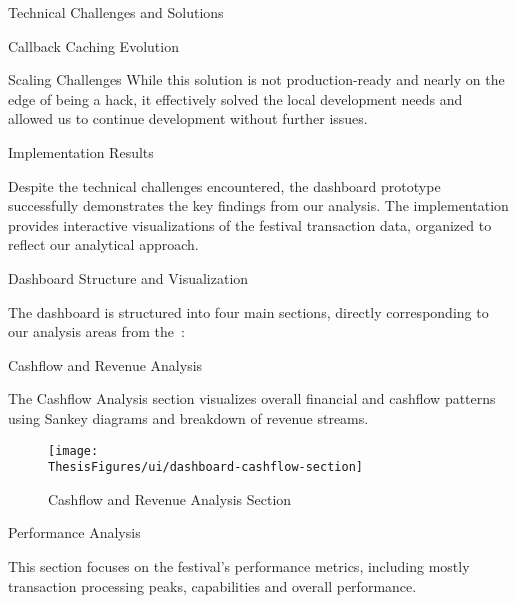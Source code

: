\begin{section}{Technical Challenges and Solutions}
\begin{subsection}{Callback Caching Evolution}
\begin{subsubsection}{Scaling Challenges}
			While this solution is not production-ready and nearly on the edge of being a hack, it effectively solved the local development needs and allowed us to continue development without further issues.
		\end{subsubsection}
	\end{subsection}
\end{section}

\begin{section}{Implementation Results}
	\label{sec:implementation-results}

	Despite the technical challenges encountered, the dashboard prototype successfully demonstrates the key findings from our analysis.
	The implementation provides interactive visualizations of the festival transaction data, organized to reflect our analytical approach.

	\begin{subsection}{Dashboard Structure and Visualization}
		\label{subsec:implementation-results-structure}

		The dashboard is structured into four main sections, directly corresponding to our analysis areas from the~:

		\begin{subsubsection}{Cashflow and Revenue Analysis}
			\label{subsubsec:implementation-results-structure-cashflow}

			The Cashflow Analysis section visualizes overall financial and cashflow patterns using Sankey diagrams and breakdown of revenue streams.

			\begin{figure}[H]
				\centering
				\texttt{[image: \\ThesisFigures/ui/dashboard-cashflow-section]}
				\caption{Cashflow and Revenue Analysis Section}
				\label{fig:dashboard-cashflow-analysis}
			\end{figure}
		\end{subsubsection}

		\begin{subsubsection}{Performance Analysis}
			\label{subsubsec:implementation-results-structure-performance}

			This section focuses on the festival's performance metrics, including mostly transaction processing peaks, capabilities and overall performance.


\end{subsubsection}
\end{subsection}
\end{section}
